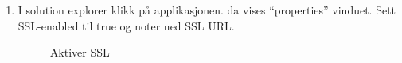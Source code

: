 \begin{enumerate}

  \item I solution explorer klikk på applikasjonen. da vises “properties” vinduet. Sett SSL-enabled til true og noter ned SSL URL.
    \begin{figure}[!htbp]
    \centering
        \begin{subfigure}{.3\textwidth}
            \centering
             {%
            \setlength{\fboxsep}{0pt}%
            \setlength{\fboxrule}{0.5pt}%
            }%
            \label{fig:aktiverSsl1}
        \end{subfigure}%
        \begin{subfigure}{.5\textwidth}
            \centering
             {%
            \setlength{\fboxsep}{0pt}%
            \setlength{\fboxrule}{0.5pt}%
            }%
            \label{fig:aktiverSsl2}
        \end{subfigure}
        \caption{Aktiver SSL}
        \label{fig:aktiverSsl}
    \end{figure}


\end{enumerate}
